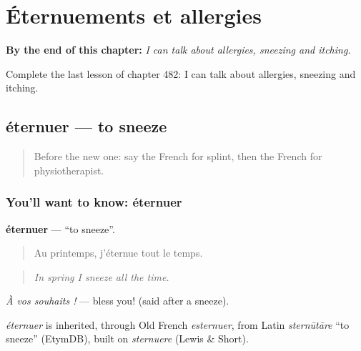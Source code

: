 
\chapter{Éternuements et allergies}
\label{ch:fr-eternuements-et-allergies}

\begin{chapteropening}
\textbf{By the end of this chapter:} \emph{I can talk about allergies, sneezing and itching.}

Complete the last lesson of chapter 482: I can talk about allergies, sneezing and itching.
\end{chapteropening}

\section[éternuer]{éternuer — to sneeze}

\label{lesson:FR-C482-eternuer}



\begin{quote}
Before the new one: say the French for splint, then the French for physiotherapist.
\end{quote}

\subsection*{You'll want to know: éternuer}
\textbf{éternuer} — \textquotedblleft{}to sneeze\textquotedblright{}.

\begin{quote}
Au printemps, j'éternue tout le temps.
\end{quote}

\begin{quote}
\emph{In spring I sneeze all the time.}
\end{quote}

\emph{À vos souhaits !} — bless you! (said after a sneeze).

\begin{cousinweb}
\emph{éternuer} is inherited, through Old French \emph{esternuer}, from Latin \emph{sternūtāre} \textquotedblleft{}to sneeze\textquotedblright{} (EtymDB), built on \emph{sternuere} (Lewis \& Short).
\end{cousinweb}

